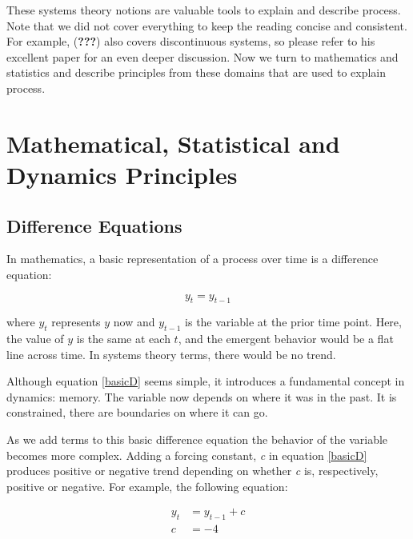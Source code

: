 \documentclass[english,,man]{apa6}
\theoremstyle{definition}
\theoremstyle{definition}
\theoremstyle{definition}
\theoremstyle{remark}
\begin{document}
These systems theory notions are valuable tools to explain and describe
process. Note that we did not cover everything to keep the reading
concise and consistent. For example, ({\textbf{???}}) also covers
discontinuous systems, so please refer to his excellent paper for an
even deeper discussion. Now we turn to mathematics and statistics and
describe principles from these domains that are used to explain process.

\hypertarget{mathematical-statistical-and-dynamics-principles}{%
\section{Mathematical, Statistical and Dynamics
Principles}\label{mathematical-statistical-and-dynamics-principles}}

\hypertarget{difference-equations}{%
\subsection{Difference Equations}\label{difference-equations}}

In mathematics, a basic representation of a process over time is a
difference equation:

\begin{equation}
\label{basicD}
y_{t} = y_{t - 1}
\end{equation}

\noindent where \(y_{t}\) represents \(y\) now and \(y_{t-1}\) is the
variable at the prior time point. Here, the value of \(y\) is the same
at each \(t\), and the emergent behavior would be a flat line across
time. In systems theory terms, there would be no trend.

Although equation \ref{basicD} seems simple, it introduces a fundamental
concept in dynamics: memory. The variable now depends on where it was in
the past. It is constrained, there are boundaries on where it can go.

As we add terms to this basic difference equation the behavior of the
variable becomes more complex. Adding a forcing constant, \emph{c} in
equation \ref{basicD} produces positive or negative trend depending on
whether \emph{c} is, respectively, positive or negative. For example,
the following equation:

\begin{equation}
\begin{split}
\label{diffC}
y_{t} &= y_{t-1} + c \\ 
c &= -4
\end{split}
\end{equation}
\end{document}
